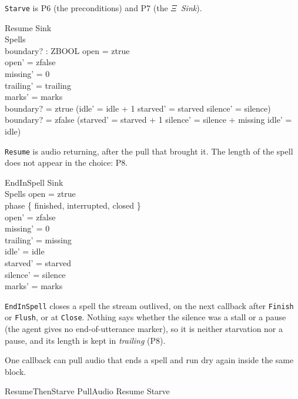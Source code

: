 \documentclass[a4paper,10pt,fleqn]{article}
\begin{document}
\texttt{Starve} is P6 (the preconditions) and P7 (the $\Xi$~\emph{Sink}).

\begin{schema}{Resume}
  \Xi Sink \\
  \Delta Spells \\
  boundary? : ZBOOL
\where
  open = ztrue \\
  open' = zfalse \\
  missing' = 0 \\
  trailing' = trailing \\
  marks' = marks \\
  boundary? = ztrue \implies
    (idle' = idle + 1 \land starved' = starved \land silence' = silence) \\
  boundary? = zfalse \implies
    (starved' = starved + 1 \land silence' = silence + missing \land idle' = idle)
\end{schema}

\texttt{Resume} is audio returning, after the pull that brought it. The
length of the spell does not appear in the choice: P8.

\begin{schema}{EndInSpell}
  \Xi Sink \\
  \Delta Spells
\where
  open = ztrue \\
  phase \in \{ finished, interrupted, closed \} \\
  open' = zfalse \\
  missing' = 0 \\
  trailing' = missing \\
  idle' = idle \\
  starved' = starved \\
  silence' = silence \\
  marks' = marks
\end{schema}

\texttt{EndInSpell} closes a spell the stream outlived, on the next callback
after \texttt{Finish} or \texttt{Flush}, or at \texttt{Close}. Nothing says
whether the silence was a stall or a pause (the agent gives no end-of-utterance
marker), so it is neither starvation nor a pause, and its length is kept in
\emph{trailing} (P8).

One callback can pull audio that ends a spell and run dry again inside the
same block.

\begin{zed}
  ResumeThenStarve  PullAudio \semi Resume \semi Starve
\end{zed}
\end{document}
